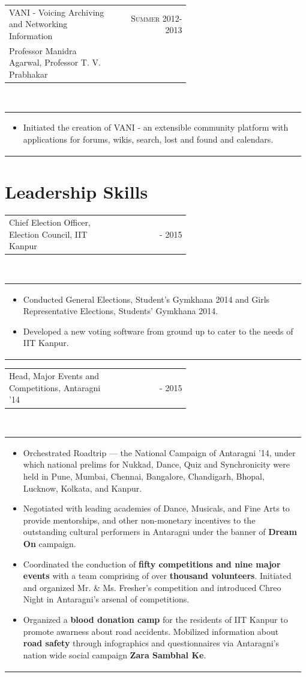 \documentclass[a4paper]{article} %
\newcommand{\verticalspacing}{-0.25cm}
\newcommand{\headspace}{-0.3cm}
\newcommand{\bulletspace}{0.7cm}
\newcommand{\projectheadspacing}{6.9cm}
\newcommand{\cproject}[5]{%
    \begin{tabular}{p{0.60\linewidth}r}
        \textcolor{NavyBlue}{\small #2} & \multicolumn{1}{m{ \projectheadspacing{} }}{\raggedleft \small {\textsc{#1}}}\\
        \small {#3} & \small {#4}
    \end{tabular}\\
    \begin{tabular}{p{0.98\linewidth}}
    \vspace{-0.3cm}
        \small{#5}
    \end{tabular}
    \vspace{\verticalspacing{}}
}
\newcommand{\gitproject}[3]{%
    \begin{tabular}{p{0.60\linewidth}r}
        \textcolor{NavyBlue}{\small #2} & \multicolumn{1}{m{ \projectheadspacing{} }}{\raggedleft #1}\\
    \end{tabular}\\
    \begin{tabular}{p{0.98\linewidth}}
        \vspace{\headspace{}}
        \small{#3}
    \end{tabular}
    \vspace{\verticalspacing{}}
    \vspace{-0.2cm} %
}
\begin{document}
\cproject
    {Summer 2012-2013}
    {VANI - Voicing Archiving and Networking Information}
    {Professor Manidra Agarwal, Professor T. V. Prabhakar}
    {}
    {%
        \begin{itemize}[leftmargin=\bulletspace{}]
            \item Initiated the creation of VANI - an extensible community platform with applications
                for forums, wikis, search, lost and found and calendars.
        \end{itemize}
    }


\section {Leadership Skills}

\gitproject
    {2014 - 2015}
    {Chief Election Officer, Election Council, IIT Kanpur}
    {%
        \begin{itemize}[leftmargin=\bulletspace{}]
            \item Conducted General Elections, Student's Gymkhana 2014 and
                Girls Representative Elections, Students' Gymkhana 2014.
            \item Developed a new voting software from ground up to cater to the needs of IIT Kanpur.
        \end{itemize}
    }

\gitproject
    {2014 - 2015}
    {Head, Major Events and Competitions, Antaragni '14}
    {%
        \begin{itemize}[leftmargin=\bulletspace{}]
            \item Orchestrated Roadtrip --- the National Campaign of Antaragni '14, under which national
                prelims for Nukkad, Dance, Quiz and Synchronicity were held in Pune, Mumbai, Chennai,
                Bangalore, Chandigarh, Bhopal, Lucknow, Kolkata, and Kanpur.
            \item Negotiated with leading academies of Dance, Musicals, and Fine Arts to provide mentorships,
                and other non-monetary incentives to the outstanding cultural performers in Antaragni
                under the banner of \textbf{Dream On} campaign.
            \item Coordinated the conduction of \textbf{fifty competitions and nine major events} with a team
                comprising of over \textbf{thousand volunteers}.  Initiated and organized Mr. \& Ms. Fresher's
                competition and introduced Chreo Night in Antaragni's arsenal of competitions.
            \item Organized a \textbf{blood donation camp} for the residents of IIT Kanpur to promote awarness
                about road accidents.  Mobilized information about \textbf{road safety} through infographics
                and questionnaires via Antaragni's nation wide social campaign \textbf{Zara Sambhal Ke}.
        \end{itemize}
    }
\end{document}
